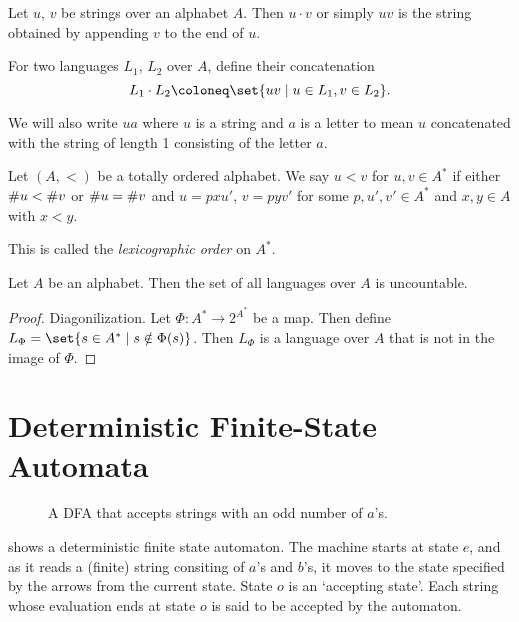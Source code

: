 \begin{definition}[Concatenation] \label{def:languages:concatenation}
    Let $u$, $v$ be strings over an alphabet $A$.
    Then $u \cdot v$ or simply $uv$ is the string obtained by appending $v$
    to the end of $u$.

    For two languages $L_1$, $L_2$ over $A$, define their concatenation \[
        L_1 \cdot L_2 \coloneq \set{uv \mid u \in L_1, v \in L_2}.
    \]
\end{definition}
We will also write $ua$ where $u$ is a string and $a$ is a letter to mean
$u$ concatenated with the string of length 1 consisting of the letter $a$.

\begin{definition*} \label{def:languages:lexicographic}
    Let $(A, <)$ be a totally ordered alphabet.
    We say $u < v$ for $u, v \in A^*$ if either $\# u < \# v$ or
    $\# u = \# v$ and $u = pxu'$, $v = pyv'$ for some $p, u', v' \in A^*$
    and $x, y \in A$ with $x < y$.

    This is called the \emph{lexicographic order} on $A^*$.
\end{definition*}

\begin{proposition*}
    Let $A$ be an alphabet.
    Then the set of all languages over $A$ is uncountable.
\end{proposition*}
\begin{proof}
    Diagonilization.
    Let $\Phi\colon A^* \to 2^{A^*}$ be a map.
    Then define $L_\Phi = \set{s \in A^* \mid s \notin \Phi(s)}$.
    Then $L_\Phi$ is a language over $A$ that is not in the image of $\Phi$.
\end{proof}

\section{Deterministic Finite-State Automata} \label{sec:dfa}
\begin{figure}[b]
    \centering
    \caption{A DFA that accepts strings with an odd number of $a$'s.}
    \label{fig:dfa:odd_a}
\end{figure}
 shows a deterministic finite state automaton.
The machine starts at state $e$,
and as it reads a (finite) string consiting of $a$'s and $b$'s,
it moves to the state specified by the arrows from the current state.
State $o$ is an `accepting state'.
Each string whose evaluation ends at state $o$ is said to be accepted by the
automaton.

